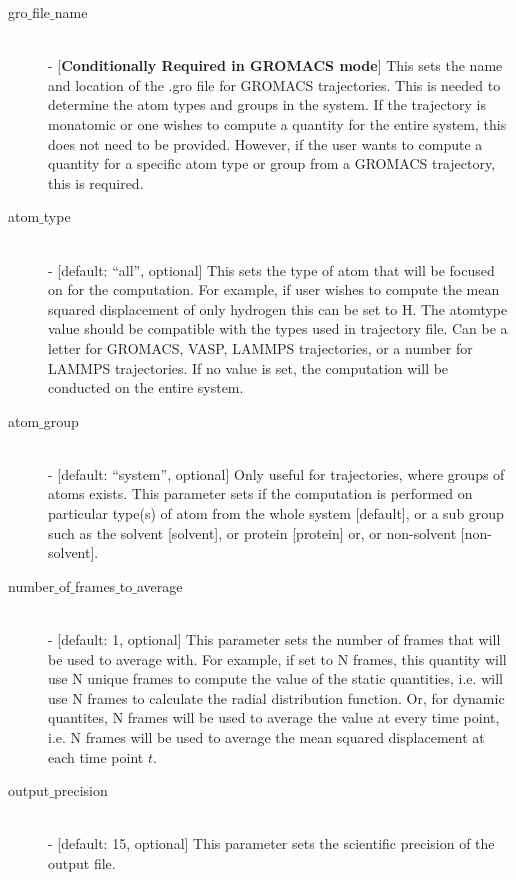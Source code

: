 \documentclass{article}
\begin{document}
\begin{description}
	\item[gro$\_$file$\_$name] \hfill \\
	- [\textbf{Conditionally Required in GROMACS mode}] This sets the name and location of the .gro file for GROMACS trajectories.  This is needed to determine the atom types and groups in the system.  If the trajectory is monatomic or one wishes to compute a quantity for the entire system, this does not need to be provided.  However, if the user wants to compute a quantity for a specific atom type or group from a GROMACS trajectory, this is required.
	
	\item[atom$\_$type] \hfill \\
	- [default: ``all'', optional]  This sets the type of atom that will be focused on for the computation.  For example, if user wishes to compute the mean squared displacement of only hydrogen this can be set to H.   The atomtype value should be compatible with the types used in trajectory file. Can be a letter for GROMACS,  VASP,  LAMMPS trajectories, or a number for LAMMPS trajectories.  If no value is set, the computation will be conducted on the entire system.
	
	\item[atom$\_$group] \hfill \\
	- [default: ``system'', optional]  Only useful for trajectories, where groups of atoms exists.  This parameter sets if the computation is performed on particular type(s) of atom from the whole system [default], or a sub group such as the solvent [solvent], or protein [protein] or, or non-solvent [non-solvent].
	
	\item[number$\_$of$\_$frames$\_$to$\_$average] \hfill \\
	- [default: 1, optional] This parameter sets the number of frames that will be used to average with.  For example, if set to N frames, this quantity will use N unique frames to compute the value of the static quantities, i.e. will use N frames to calculate the radial distribution function.  Or, for dynamic quantites, N frames will be used to average the value at every time point, i.e. N frames will be used to average the mean squared displacement at each time point $t$.
	
	\item[output$\_$precision] \hfill \\
	- [default: 15, optional] This parameter sets the scientific precision of the output file.
	
	
\end{description}
\end{document}
